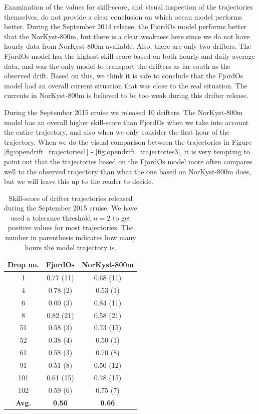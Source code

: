 Examination of the values for skill-score, and visual inspection of the trajectories themselves, do not provide a clear conclusion on which ocean model performs better. During the September 2014 release, the FjordOs model performs better that the NorKyst-800m, but there is a clear weakness here since we do not have hourly data from NorKyst-800m available. Also, there are only two drifters. The FjordOs model has the highest skill-score based on both hourly and daily average data, and was the only model to transport the drifters as far south as the observed drift. Based on this, we think it is safe to conclude that the FjordOs model had an overall current situation that was close to the real situation. The currents in NorKyst-800m is believed to be too weak during this drifter release.

During the September 2015 cruise we released 10 drifters. The NorKyst-800m model has an overall higher skill-score than FjordOs when we take into account the entire trajectory, and  also when we only consider the first hour of the trajectory. When we do the visual comparison between the trajectories in Figure \ref{fig:opendrift_trajectories1} - \ref{fig:opendrift_trajectories3}, it is very tempting to point out that the trajectories based on the FjordOs model more often compares well to the observed trajectory than what the one based on NorKyst-800m does, but we will leave this up to the reader to decide.

\begin{table}
\begin{center}
  \begin{tabular}{ | c | c | c |}
    \hline
    {\bf Drop no.} & {\bf FjordOs} & {\bf NorKyst-800m} \\ \hline
    1 & 0.77 (11) & 0.68 (11) \\ 
    4 & 0.78 (2) & 0.53 (1) \\
    6 & 0.00 (3) & 0.84 (11) \\
    8 & 0.82 (21) & 0.58 (21) \\
    51 & 0.58 (3) & 0.73 (15) \\
    52 & 0.38 (4) & 0.50 (1) \\
    61 & 0.58 (3) & 0.70 (8) \\
    91 & 0.51 (8) & 0.50 (12) \\
    101 & 0.61 (15) & 0.78 (15) \\
    102 & 0.59 (6) & 0.75 (7) \\ \hline
    {\bf Avg.} & {\bf 0.56} & {\bf 0.66} \\
    \hline
  \end{tabular}
\caption{Skill-score of drifter trajectories released during the September 2015 cruise. We have used a tolerance threshold $n=2$ to get positive values for most trajectories. The number in parenthesis indicates how many hours the model trajectory is.}
\label{tab:skillscore_full}
\end{center}
\end{table}

